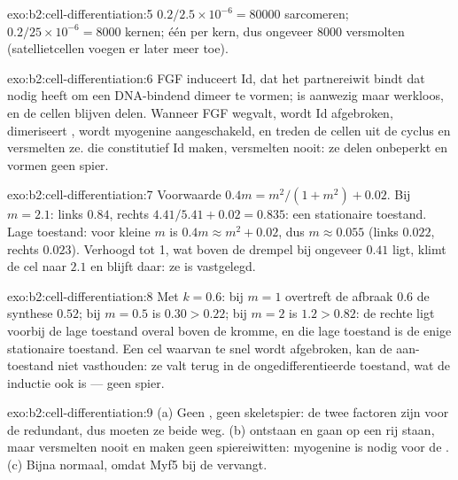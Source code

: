 \begin{solution}{exo:b2:cell-differentiation:5}
$0.2/2.5\times 10^{-6} = \num{80000}$ sarcomeren; $0.2/25\times 10^{-6}
= \num{8000}$ kernen; één  per kern, dus ongeveer \num{8000}
versmolten  (satellietcellen voegen er later meer toe).
\end{solution}

\begin{solution}{exo:b2:cell-differentiation:6}
FGF induceert Id, dat het partnereiwit bindt dat  nodig heeft om een
DNA-bindend dimeer te vormen;  is aanwezig maar werkloos, en de cellen
blijven delen. Wanneer FGF wegvalt, wordt Id afgebroken, dimeriseert ,
wordt myogenine aangeschakeld, en treden de cellen uit de cyclus en
versmelten ze.  die constitutief Id maken, versmelten nooit: ze
delen onbeperkt en vormen geen spier.
\end{solution}

\begin{solution}{exo:b2:cell-differentiation:7}
Voorwaarde $0.4m = m^{2}/(1 + m^{2}) + 0.02$. Bij $m = 2.1$: links
$0.84$, rechts $4.41/5.41 + 0.02 = 0.835$: een stationaire toestand. Lage
toestand: voor kleine $m$ is $0.4m \approx m^{2} + 0.02$, dus $m \approx
0.055$ (links $0.022$, rechts $0.023$). Verhoogd tot 1, wat boven de
drempel bij ongeveer $0.41$ ligt, klimt de cel naar $2.1$ en blijft daar:
ze is vastgelegd.
\end{solution}

\begin{solution}{exo:b2:cell-differentiation:8}
Met $k = 0.6$: bij $m = 1$ overtreft de afbraak $0.6$ de synthese
$0.52$; bij $m = 0.5$ is $0.30 > 0.22$; bij $m = 2$ is $1.2 > 0.82$: de
rechte ligt voorbij de lage toestand overal boven de kromme, en die lage
toestand is de enige stationaire toestand. Een cel waarvan  te snel
wordt afgebroken, kan de aan-toestand niet vasthouden: ze valt terug in de
ongedifferentieerde toestand, wat de inductie ook is --- geen spier.
\end{solution}

\begin{solution}{exo:b2:cell-differentiation:9}
(a) Geen , geen skeletspier: de twee factoren zijn voor de
 redundant, dus moeten ze beide weg. (b)  ontstaan
en gaan op een rij staan, maar versmelten nooit en maken geen spiereiwitten:
myogenine is nodig voor de . (c) Bijna normaal, omdat Myf5
 bij de  vervangt.
\end{solution}

